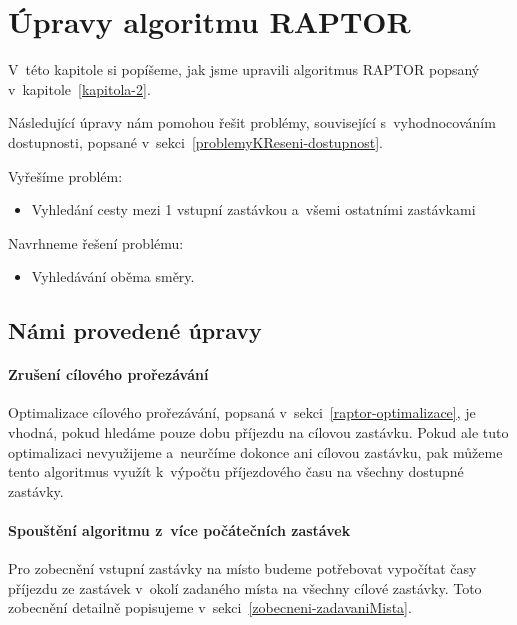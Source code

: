 \chapter{Úpravy algoritmu RAPTOR}

V~této kapitole si popíšeme, jak jsme upravili algoritmus RAPTOR popsaný v~kapitole~\ref{kapitola-2}.

Následující úpravy nám pomohou řešit problémy, související s~vyhodnocováním dostupnosti, popsané v~sekci~\ref{problemyKReseni-dostupnost}.

Vyřešíme problém:
\begin{itemize}
    \item Vyhledání cesty mezi 1 vstupní zastávkou a~všemi ostatními zastávkami
\end{itemize}

Navrhneme řešení problému:
\begin{itemize}
    \item Vyhledávání oběma směry.
\end{itemize}


\section{Námi provedené úpravy}

\subsubsection{Zrušení cílového prořezávání}

Optimalizace cílového prořezávání, popsaná v~sekci~\ref{raptor-optimalizace}, je vhodná, pokud hledáme pouze dobu příjezdu na cílovou zastávku. Pokud ale tuto optimalizaci nevyužijeme a~neurčíme dokonce ani cílovou zastávku, pak můžeme tento algoritmus využít k~výpočtu příjezdového času na všechny dostupné zastávky.

\subsubsection{Spouštění algoritmu z~více počátečních zastávek} \label{raptor-vicePocatecnichZastavek}

Pro zobecnění vstupní zastávky na místo budeme potřebovat vypočítat časy příjezdu ze zastávek v~okolí zadaného místa na všechny cílové zastávky. Toto zobecnění detailně popisujeme v~sekci~\ref{zobecneni-zadavaniMista}.

